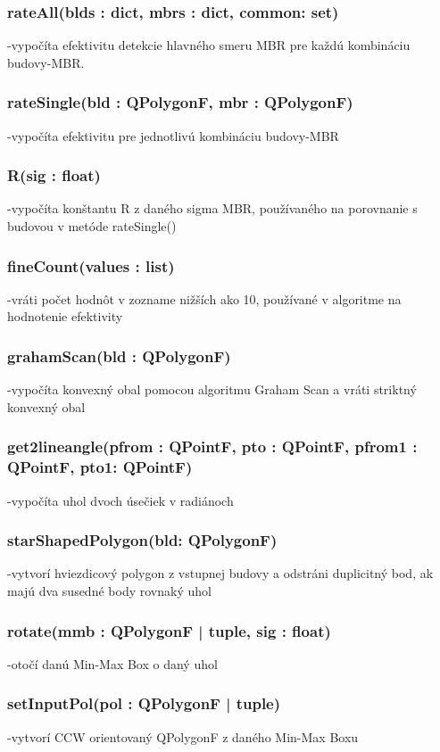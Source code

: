 \documentclass[12pt]{article}
\begin{document}
\subsubsection*{rateAll(blds : dict, mbrs : dict, common\textunderscorek : set)}
\noindent-vypočíta efektivitu detekcie hlavného smeru MBR pre každú kombináciu budovy-MBR.
\subsubsection*{rateSingle(bld : QPolygonF, mbr : QPolygonF)}
\noindent-vypočíta efektivitu pre jednotlivú kombináciu budovy-MBR
\subsubsection*{R(sig : float)}
\noindent-vypočíta konštantu R z daného sigma MBR, používaného na porovnanie s budovou v metóde rateSingle()
\subsubsection*{fineCount(values : list)}
\noindent-vráti počet hodnôt v zozname nižších ako 10, používané v algoritme na hodnotenie efektivity
\subsubsection*{grahamScan(bld : QPolygonF)}
\noindent-vypočíta konvexný obal pomocou algoritmu Graham Scan a vráti striktný konvexný obal
\subsubsection*{get\textunderscore 2line\textunderscore angle(p\textunderscore from : QPointF, p\textunderscore to : QPointF, p\textunderscore from1 : QPointF, p\textunderscore to1: QPointF) }
\noindent-vypočíta uhol dvoch úsečiek v radiánoch
\subsubsection*{starShapedPolygon(bld: QPolygonF)}
\noindent-vytvorí hviezdicový polygon z vstupnej budovy a odstráni duplicitný bod, ak majú dva susedné body rovnaký uhol
\subsubsection*{rotate(mmb : QPolygonF | tuple, sig : float)}
\noindent-otočí danú Min-Max Box o daný uhol
\subsubsection*{setInputPol(pol : QPolygonF | tuple)}
\noindent-vytvorí CCW orientovaný QPolygonF z daného Min-Max Boxu
\end{document}

